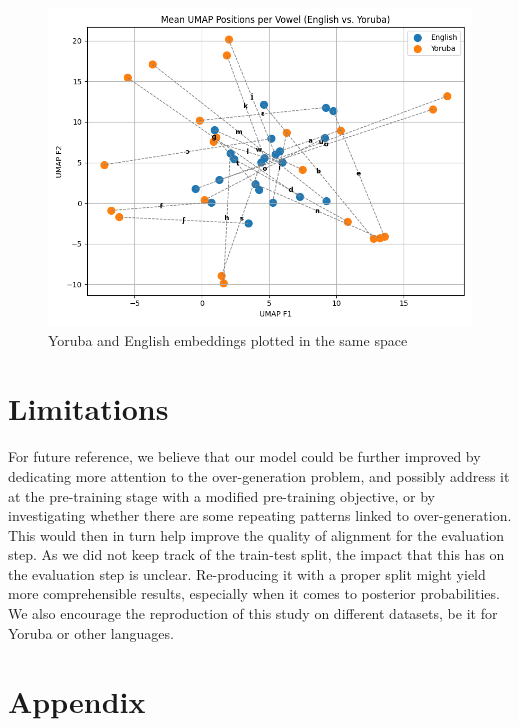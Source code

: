 \documentclass[11pt]{article}
\begin{document}
{\begin{figure}
    \centering
    \includegraphics[width=1\linewidth]{yoruba_eng_plot.png}
    \caption{Yoruba and English embeddings plotted in the same space}
    \label{fig:placeholder}
\end{figure}




\section*{Limitations}

For future reference, we believe that our model could be further improved by dedicating more attention to the over-generation problem, and possibly address it at the pre-training stage with a modified pre-training objective, or by investigating whether there are some repeating patterns linked to over-generation. This would then in turn help improve the quality of alignment for the evaluation step.
As we did not keep track of the train-test split, the impact that this has on the evaluation step is unclear. Re-producing it with a proper split might yield more comprehensible results, especially when it comes to posterior probabilities.
We also encourage the reproduction of this study on different datasets, be it for Yoruba or other languages.






\appendix
\section{Appendix}
\label{sec:appendix}
}
\end{document}
